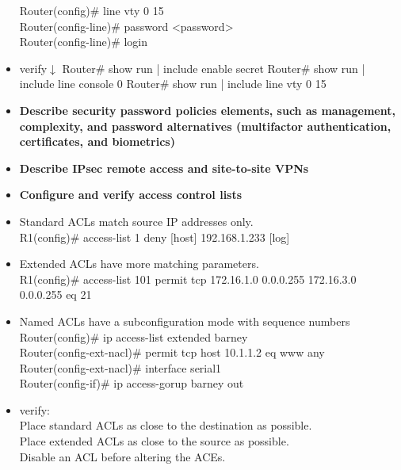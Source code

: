 \documentclass{article}
\begin{document}
\begin{itemize}
  		Router(config)\# line vty 0 15\\
  		Router(config-line)\# password \textless password\textgreater\\
  		Router(config-line)\# login
  	\item[] verify$\downarrow$
  		Router\# show run | include enable secret
  		Router\# show run | include line console 0
  		Router\# show run | include line vty 0 15
  \item \textbf{Describe security password policies elements, such as management, complexity, and password alternatives (multifactor authentication, certificates, and biometrics)}
  \item \textbf{Describe IPsec remote access and site-to-site VPNs}
  \item \textbf{Configure and verify access control lists}
  	\item[] Standard ACLs match source IP addresses only.\\
  		R1(config)\# access-list 1 deny [host] 192.168.1.233 [log]
  	\item[] Extended ACLs have more matching parameters.\\
  		R1(config)\# access-list 101 permit tcp 172.16.1.0 0.0.0.255 172.16.3.0 0.0.0.255 eq 21
  	\item[] Named ACLs have a subconfiguration mode with sequence numbers\\
  		Router(config)\# ip access-list extended barney\\
  		Router(config-ext-nacl)\# permit tcp host 10.1.1.2 eq www any\\
  		Router(config-ext-nacl)\# interface serial1\\
  		Router(config-if)\# ip access-gorup barney out
  	\item[] verify:\\
  		Place standard ACLs as close to the destination as possible.\\
  		Place extended ACLs as close to the source as possible.\\
  		Disable an ACL before altering the ACEs.
  		

\end{itemize}
\end{document}

